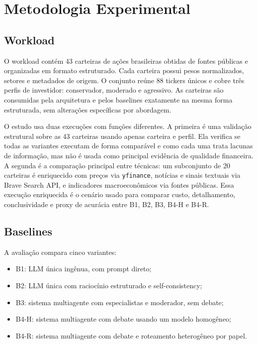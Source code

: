 \section{Metodologia Experimental}

\subsection{Workload}

O workload contém 43 carteiras de ações brasileiras obtidas de fontes
públicas e organizadas em formato estruturado. Cada carteira possui pesos
normalizados, setores e metadados de origem. O conjunto reúne 88 tickers
únicos e cobre três perfis de investidor: conservador, moderado e
agressivo. As carteiras são consumidas pela arquitetura e pelos baselines
exatamente na mesma forma estruturada, sem alterações específicas por
abordagem.

O estudo usa duas execuções com funções diferentes. A primeira é uma
validação estrutural sobre as 43 carteiras usando apenas carteira e perfil.
Ela verifica se todas as variantes executam de forma comparável e como cada
uma trata lacunas de informação, mas não é usada como principal evidência de
qualidade financeira. A segunda é a comparação principal entre técnicas:
um subconjunto de 20 carteiras é enriquecido com preços via
\texttt{yfinance}, notícias e sinais textuais via Brave Search API, e
indicadores macroeconômicos via fontes públicas. Essa execução enriquecida
é o cenário usado para comparar custo, detalhamento, conclusividade e proxy
de acurácia entre B1, B2, B3, B4-H e B4-R.

\subsection{Baselines}

A avaliação compara cinco variantes:

\begin{itemize}
  \item B1: LLM única ingênua, com prompt direto;
  \item B2: LLM única com raciocínio estruturado e self-consistency;
  \item B3: sistema multiagente com especialistas e moderador, sem debate;
  \item B4-H: sistema multiagente com debate usando um modelo homogêneo;
  \item B4-R: sistema multiagente com debate e roteamento heterogêneo por
  papel.
\end{itemize}

